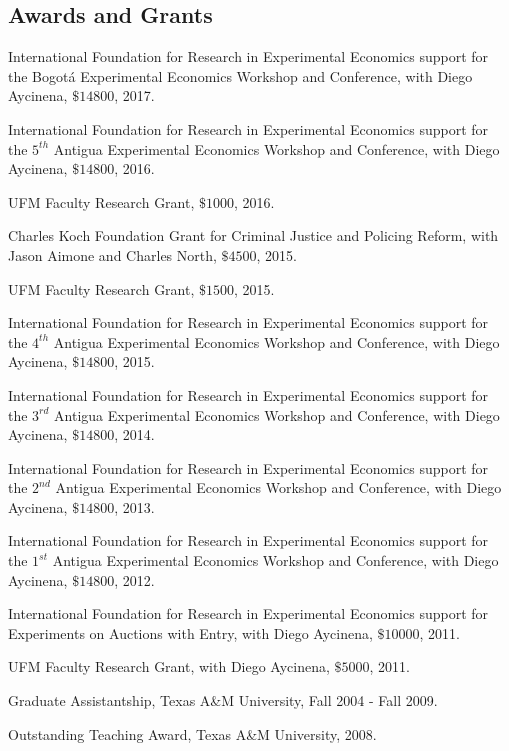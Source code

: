 \documentclass{article}%
\renewenvironment{itemize}{
\begin{list}{}{
\setlength{\leftmargin}{1.5em}
}
}{
\end{list}
}
\begin{document}
\subsection*{Awards and Grants}

\begin{itemize}
\item International Foundation for Research in Experimental Economics support for the Bogot\'{a} Experimental Economics Workshop and Conference, with Diego Aycinena, $\$14800$, 2017.
\item International Foundation for Research in Experimental Economics support for the $5^{th}$ Antigua Experimental Economics Workshop and Conference, with Diego Aycinena, $\$14800$, 2016.
\item UFM Faculty Research Grant, $\$1000$, 2016.
\item Charles Koch Foundation Grant for Criminal Justice and Policing Reform, with Jason Aimone and Charles  North, $\$4500$, 2015.
\item UFM Faculty Research Grant, $\$1500$, 2015.
\item International Foundation for Research in Experimental Economics support for the $4^{th}$ Antigua Experimental Economics Workshop and Conference, with Diego Aycinena, $\$14800$, 2015.
\item International Foundation for Research in Experimental Economics support for the $3^{rd}$ Antigua Experimental Economics Workshop and Conference, with Diego Aycinena, $\$14800$, 2014.
\item International Foundation for Research in Experimental Economics support for the $2^{nd}$ Antigua Experimental Economics Workshop and Conference, with Diego Aycinena, $\$14800$, 2013.
\item International Foundation for Research in Experimental Economics support for the $1^{st}$ Antigua Experimental Economics Workshop and Conference, with Diego Aycinena, $\$14800$, 2012.
\item International Foundation for Research in Experimental Economics support for Experiments on Auctions with Entry, with Diego Aycinena, $\$10000$, 2011.

\item UFM Faculty Research Grant, with Diego Aycinena, $\$5000$, 2011.

\item Graduate Assistantship, Texas A\&M University, Fall 2004 - Fall 2009.

\item Outstanding Teaching Award, Texas A\&M University, 2008.

\end{itemize}
\end{document}
